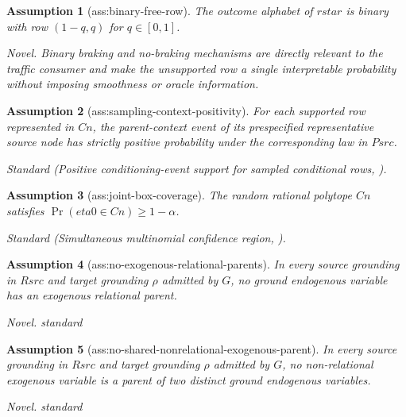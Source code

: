 \documentclass{article}
\newtheorem{assumption}{Assumption}
\begin{document}
\begin{assumption}[ass:binary-free-row]\label{ass:binary-free-row}
The outcome alphabet of \(rstar\) is binary with row \((1-q,q)\) for \(q\in[0,1]\).
\par\smallskip\noindent\emph{Novel.} Binary braking and no-braking mechanisms are directly relevant to the traffic consumer and make the unsupported row a single interpretable probability without imposing smoothness or oracle information.
\end{assumption}

\begin{assumption}[ass:sampling-context-positivity]\label{ass:sampling-context-positivity}
For each supported row represented in \(Cn\), the parent-context event of its prespecified representative source node has strictly positive probability under the corresponding law in \(Psrc\).
\par\smallskip\noindent\emph{Standard} (Positive conditioning-event support for sampled conditional rows, \cite{EjazBareinboim2026RSCM}).
\end{assumption}

\begin{assumption}[ass:joint-box-coverage]\label{ass:joint-box-coverage}
The random rational polytope \(Cn\) satisfies \(\Pr(eta0\in Cn)\ge 1-\alpha\).
\par\smallskip\noindent\emph{Standard} (Simultaneous multinomial confidence region, \cite{DuarteEtAl2024Autobounds}).
\end{assumption}

\begin{assumption}[ass:no-exogenous-relational-parents]\label{ass:no-exogenous-relational-parents}
In every source grounding in \(Rsrc\) and target grounding \(\rho\) admitted by \(G\), no ground endogenous variable has an exogenous relational parent.
\par\smallskip\noindent\emph{Novel.} standard
\end{assumption}

\begin{assumption}[ass:no-shared-nonrelational-exogenous-parent]\label{ass:no-shared-nonrelational-exogenous-parent}
In every source grounding in \(Rsrc\) and target grounding \(\rho\) admitted by \(G\), no non-relational exogenous variable is a parent of two distinct ground endogenous variables.
\par\smallskip\noindent\emph{Novel.} standard
\end{assumption}
\end{document}
